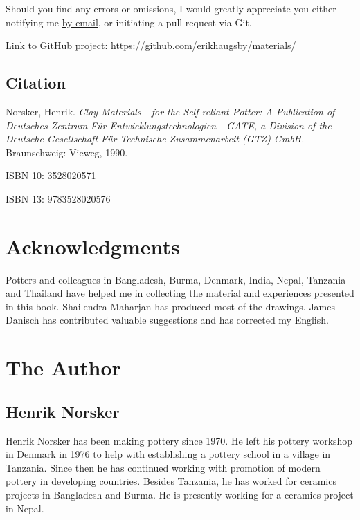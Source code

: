 Should you find any errors or omissions, I would greatly appreciate you either 
notifying me \href{mailto:e@erikhaugsby.com}{by email}, or initiating a pull 
request via Git. 

Link to GitHub project: 
\href{https://github.com/erikhaugsby/materials/}{https://github.com/erikhaugsby/materials/}
\subsection*{Citation}

Norsker, Henrik. \textit{Clay Materials - for the 
  Self-reliant Potter: A Publication of Deutsches Zentrum F\"{u}r 
  Entwicklungstechnologien - GATE, a Division of the Deutsche Gesellschaft 
  F\"{u}r Technische Zusammenarbeit (GTZ) GmbH.} Braunschweig: Vieweg, 1990.

ISBN 10: 3528020571

ISBN 13: 9783528020576
\newpage
\section*{Acknowledgments}
Potters and colleagues in Bangladesh, Burma, Denmark, India, Nepal, Tanzania 
and Thailand have helped me in collecting the material and experiences 
presented in this book. Shailendra Maharjan has produced most of the drawings. 
James Danisch has contributed valuable suggestions and has corrected my English.
\section*{The Author}
\subsection*{Henrik Norsker} 
Henrik Norsker has been making pottery since 1970. He left his pottery workshop 
in Denmark in 1976 to help with establishing a pottery school in a village in 
Tanzania. Since then he has continued working with promotion of modern pottery 
in developing countries. Besides Tanzania, he has worked for ceramics projects 
in Bangladesh and Burma. He is presently working for a ceramics project in 
Nepal.
